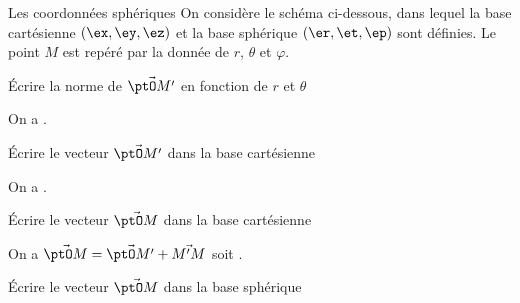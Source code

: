 
\begin{exo}[PC][1][appli]{Les coordonnées sphériques}
  \hauteurLargeurCadreReponse		{8mm}{4cm}
  \initialisationPartieGauche
   On considère le schéma ci-dessous, dans lequel la base cartésienne $(\ex,\ey,\ez)$
  et la base sphérique $(\er,\et,\ep)$
    sont définies.     Le point $M$ est repéré par la donnée de $r$, $\theta$ et $\varphi$.


  \begin{enonce}
  	Écrire la norme de $\Vec{\ptO M'}$ en fonction de $r$ et $\theta$
  \end{enonce}


  \begin{corrige}
  	On a .
  \end{corrige}
  \begin{enonce}
  	Écrire le vecteur $\Vec{\ptO M'}$ dans la base cartésienne
  \end{enonce}


  \begin{corrige}
  	On a .
  \end{corrige}
  \begin{enonce}
  	Écrire le vecteur $\Vec{\ptO M}$ dans la base cartésienne
  	\end{enonce}


  	\begin{corrige}
  		On a $\Vec{\ptO M}=\Vec{\ptO M'}+\Vec{M' M}$ soit .
  	\end{corrige}
  	\begin{enonce}
  		Écrire le vecteur $\Vec{\ptO M}$ dans la base sphérique
  	\end{enonce}


\end{exo}
